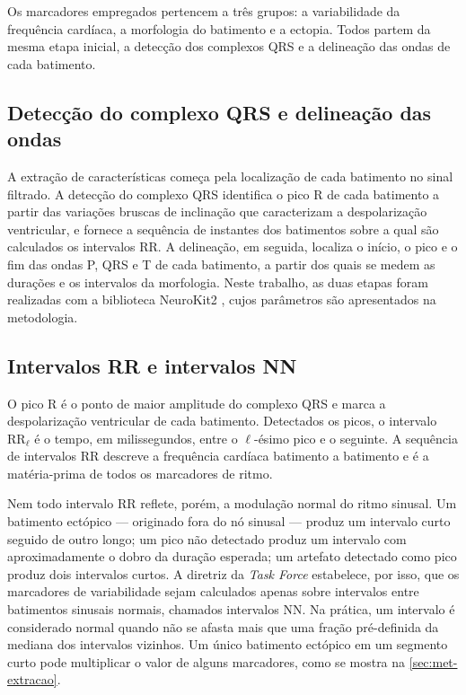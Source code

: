 Os marcadores empregados pertencem a três grupos: a variabilidade da
frequência cardíaca, a morfologia do batimento e a ectopia. Todos partem da
mesma etapa inicial, a detecção dos complexos QRS e a delineação das ondas
de cada batimento.

\subsection{Detecção do complexo QRS e delineação das ondas}
\label{subsec:fund-deteccao-qrs}

A extração de características começa pela localização de cada batimento no
sinal filtrado. A detecção do complexo QRS identifica o pico R de cada
batimento a partir das variações bruscas de inclinação que caracterizam a
despolarização ventricular, e fornece a sequência de instantes dos
batimentos sobre a qual são calculados os intervalos RR. A delineação, em
seguida, localiza o início, o pico e o fim das ondas P, QRS e T de cada
batimento, a partir dos quais se medem as durações e os intervalos da
morfologia. Neste trabalho, as duas etapas foram realizadas com a
biblioteca NeuroKit2 \cite{makowski2021neurokit2}, cujos parâmetros são
apresentados na metodologia.

\subsection{Intervalos RR e intervalos NN}
\label{subsec:fund-rr-nn}

O pico R é o ponto de maior amplitude do complexo QRS e marca a
despolarização ventricular de cada batimento. Detectados os picos, o
intervalo $\mathrm{RR}_\ell$ é o tempo, em milissegundos, entre o
$\ell$-ésimo pico e o seguinte. A sequência de intervalos RR descreve a
frequência cardíaca batimento a batimento e é a matéria-prima de todos os
marcadores de ritmo.

Nem todo intervalo RR reflete, porém, a modulação normal do ritmo sinusal.
Um batimento ectópico --- originado fora do nó sinusal --- produz um
intervalo curto seguido de outro longo; um pico não detectado produz um
intervalo com aproximadamente o dobro da duração esperada; um artefato
detectado como pico produz dois intervalos curtos. A diretriz da
\textit{Task Force} \cite{taskforce1996heart} estabelece, por isso, que os
marcadores de variabilidade sejam calculados apenas sobre intervalos entre
batimentos sinusais normais, chamados intervalos NN. Na prática, um
intervalo é considerado normal quando não se afasta mais que uma fração
pré-definida da mediana dos intervalos vizinhos. Um único batimento
ectópico em um segmento curto pode multiplicar o valor de alguns marcadores,
como se mostra na \autoref{sec:met-extracao}.

